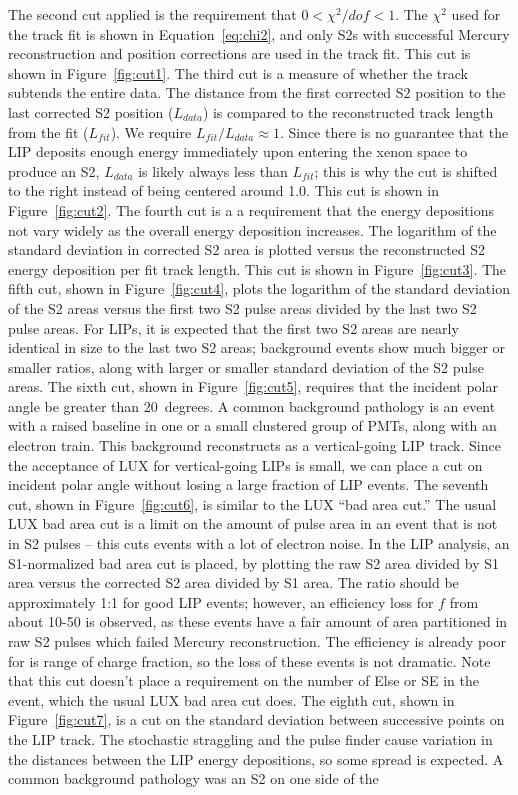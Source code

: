 The second cut applied is the requirement that $0 < \chi^{2}/dof < 1$. The  $\chi^{2}$ used for the track fit is shown in Equation~\ref{eq:chi2}, and only S2s with successful Mercury reconstruction and position corrections are used in the track fit. This cut is shown in Figure~\ref{fig:cut1}. The third cut is a measure of whether the track subtends the entire data. The distance from the first corrected S2 position to the last corrected S2 position ($L_{data}$) is compared to the reconstructed track length from the fit ($L_{fit}$). We require $L_{fit}/L_{data} \approx 1$. Since there is no guarantee that the \ac{LIP} deposits enough energy immediately upon entering the xenon space to produce an S2, $L_{data}$ is likely always less than $L_{fit}$; this is why the cut is shifted to the right instead of being centered around 1.0. This cut is shown in Figure~\ref{fig:cut2}. The fourth cut is a a requirement that the energy depositions not vary widely as the overall energy deposition increases. The logarithm of the standard deviation in corrected S2 area is plotted versus the reconstructed S2 energy deposition per fit track length. This cut is shown in Figure~\ref{fig:cut3}. The fifth cut, shown in Figure~\ref{fig:cut4}, plots the logarithm of the standard deviation of the S2 areas versus the first two S2 pulse areas divided by the last two S2 pulse areas. For \ac{LIP}s, it is expected that the first two S2 areas are nearly identical in size to the last two S2 areas; background events show much bigger or smaller ratios, along with larger or smaller standard deviation of the S2 pulse areas. The sixth cut, shown in Figure~\ref{fig:cut5}, requires that the incident polar angle be greater than 20~degrees. A common background pathology is an event with a raised baseline in one or a small clustered group of \ac{PMT}s, along with an electron train. This background reconstructs as a vertical-going \ac{LIP} track. Since the acceptance of \ac{LUX} for vertical-going \ac{LIP}s is small, we can place a cut on incident polar angle without losing a large fraction of \ac{LIP} events. The seventh cut, shown in Figure~\ref{fig:cut6}, is similar to the \ac{LUX} ``bad area cut.'' The usual \ac{LUX} bad area cut is a limit on the amount of pulse area in an event that is not in S2 pulses -- this cuts events with a lot of electron noise. In the \ac{LIP} analysis, an S1-normalized bad area cut is placed, by plotting the raw S2 area divided by S1 area versus the corrected S2 area divided by S1 area. The ratio should be approximately 1:1 for good \ac{LIP} events; however, an efficiency loss for $f$ from about 10-50 is observed, as these events have a fair amount of area partitioned in raw S2 pulses which failed Mercury reconstruction. The efficiency is already poor for is range of charge fraction, so the loss of these events is not dramatic. Note that this cut doesn't place a requirement on the number of Else or SE in the event, which the usual \ac{LUX} bad area cut does. The eighth cut, shown in Figure~\ref{fig:cut7}, is a cut on the standard deviation between successive points on the \ac{LIP} track. The stochastic straggling and the pulse finder cause variation in the distances between the \ac{LIP} energy depositions, so some spread is expected. A common background pathology was an S2 on one side of the 